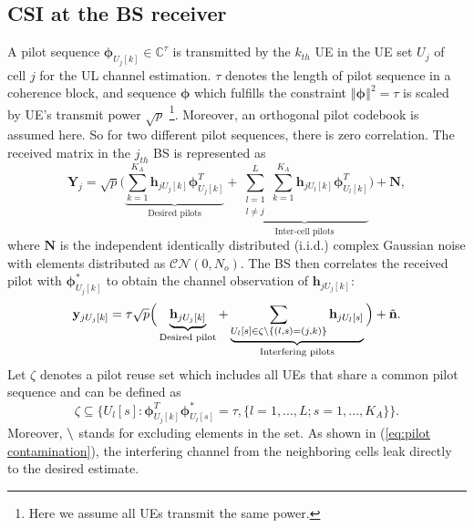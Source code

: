 \subsection{CSI at the BS receiver}
A pilot sequence $\mathbf{\phi}_{U_j[k]}\in \mathbb{C}^{\tau} $ is transmitted by the $k_{th}$ UE in the UE set $U_j$ of cell $j$ for the UL channel estimation. $\tau$ denotes the length of pilot sequence in a coherence block, and sequence $\mathbf{{\phi}}$ which fulfills the constraint $\left\Vert\mathbf{\phi}\right\Vert^2=\tau$ is scaled by UE's transmit power $\sqrt{p}$ \footnote{Here we assume all UEs transmit the same power. }. Moreover, an orthogonal pilot codebook is assumed here. So for two different pilot sequences, there is zero correlation.  The received matrix in the $j_{th}$ BS is represented as 
\begin{equation} \label{eq:Yj}
\mathbf{Y}_j = \sqrt{p}\Big(\underbrace{\sum_{k = 1}^{K_A} \mathbf{h}_{jU_j[k]} \mathbf{\phi}_{U_j[k]}^T}_\text{Desired pilots} +\underbrace{\sum_{\substack{l=1 \\ l\neq j}}^{L}\sum_{k = 1}^{K_A} \mathbf{h}_{jU_l[k]} \mathbf{\phi}_{U_l[k]}^T}_\text{Inter-cell pilots}\Big) + \mathbf{N},   
\end{equation}
where $\mathbf{N}$ is the independent identically distributed
(i.i.d.) complex Gaussian noise with elements distributed as $\mathcal{CN\left(\mathit{0,N_o}\right)}$.
The BS then correlates the received pilot with $\mathbf{\phi}_{U_j[k]}^*$ to obtain the channel observation of $\mathbf{h}_{jU_j[k]}$:%
\begin{equation} 
\mathbf{y}_{jU_j[k]} = \tau\sqrt{p}\Big(\underbrace{\mathbf{h}_{jU_j[k]}}_\text{Desired pilot} +\underbrace{\sum_{U_l[s]\in \\ \zeta\char`\\\{(l,s) = (j,k)\}}\mathbf{h}_{jU_l[s]}}_\text{Interfering pilots}\Big) + \tilde{\mathbf{n}}.   \label{eq:pilot contamination}
\end{equation}
Let $\zeta$ denotes a pilot reuse set which includes all UEs that share a common pilot sequence and can be defined as
\begin{equation}
\zeta \subseteq \{U_l[s]:\mathbf{\phi}_{U_j[k]}^T \mathbf{\phi}_{U_l[s]}^*=\tau, \{l=1,...,L;s=1,...,K_A\}\}.
\end{equation}
Moreover, $\char`\\$ stands for excluding elements in the set. As shown in (\ref{eq:pilot contamination}), the interfering channel from the neighboring cells leak directly to the desired estimate.

